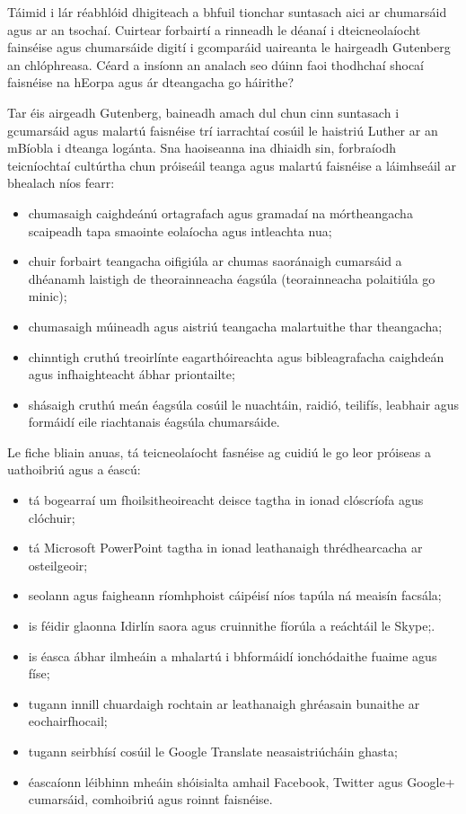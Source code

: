 \begin{multicols}{2}

Táimid i lár réabhlóid dhigiteach a bhfuil tionchar suntasach aici ar chumarsáid agus ar an tsochaí. Cuirtear forbairtí a rinneadh le déanaí i dteicneolaíocht fainséise agus chumarsáide digití i gcomparáid uaireanta le hairgeadh Gutenberg an chlóphreasa. Céard a insíonn an analach seo dúinn faoi thodhchaí shocaí faisnéise na hEorpa agus ár dteangacha go háirithe?


Tar éis airgeadh Gutenberg, baineadh amach dul chun cinn suntasach i gcumarsáid agus malartú faisnéise trí iarrachtaí cosúil le haistriú Luther ar an mBíobla i dteanga logánta. Sna haoiseanna ina dhiaidh sin, forbraíodh teicníochtaí cultúrtha chun próiseáil teanga agus malartú faisnéise a láimhseáil ar bhealach níos fearr:

\medskip
\begin{itemize}
\item chumasaigh caighdeánú ortagrafach agus gramadaí na mórtheangacha scaipeadh tapa smaointe eolaíocha agus intleachta nua;
\item chuir forbairt teangacha oifigiúla ar chumas saoránaigh cumarsáid a dhéanamh laistigh de theorainneacha éagsúla (teorainneacha polaitiúla go minic);
\item chumasaigh múineadh agus aistriú teangacha malartuithe thar theangacha;
\item chinntigh cruthú treoirlínte eagarthóireachta agus bibleagrafacha caighdeán agus infhaighteacht ábhar priontailte;
\medskip
\item shásaigh cruthú meán éagsúla cosúil le nuachtáin, raidió, teilifís, leabhair agus formáidí eile riachtanais éagsúla chumarsáide.
\end{itemize}

Le fiche bliain anuas, tá teicneolaíocht fasnéise ag cuidiú le go leor próiseas a uathoibriú agus a éascú:

\begin{itemize}
\item tá bogearraí um fhoilsitheoireacht deisce tagtha in ionad clóscríofa agus clóchuir;
\item tá Microsoft PowerPoint tagtha in ionad leathanaigh thrédhearcacha ar osteilgeoir;
\item seolann agus faigheann ríomhphoist cáipéisí níos tapúla ná meaisín facsála;
\item is féidir glaonna Idirlín saora agus cruinnithe fíorúla a reáchtáil le Skype;.
\item is éasca ábhar ilmheáin a mhalartú i bhformáidí ionchódaithe fuaime agus físe;
\item tugann innill chuardaigh rochtain ar leathanaigh ghréasain bunaithe ar eochairfhocail;
\item tugann seirbhísí cosúil le Google Translate neasaistriúcháin ghasta;
\item éascaíonn léibhinn mheáin shóisialta amhail Facebook, Twitter agus Google+ cumarsáid, comhoibriú agus roinnt faisnéise.
\end{itemize}


\end{multicols}
